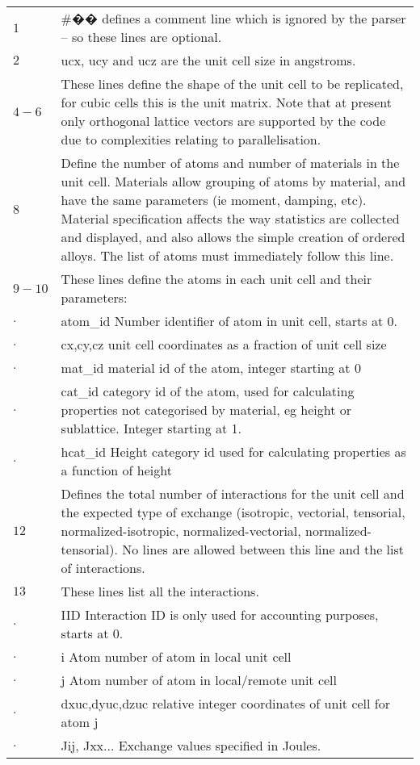 \begin{tabular}{ l p{8cm} }
$1$    & \#�� defines a comment line which is ignored by the parser – so these lines are optional.\\
$2$    & ucx, ucy and ucz are the unit cell size in angstroms.\\
$4-6$  & These lines define the shape of the unit cell to be replicated, for cubic cells this is the unit matrix. Note that at present only orthogonal lattice vectors are supported by the code due to complexities relating to parallelisation.\\
$8$    & Define the number of atoms and number of materials in the unit cell. Materials allow grouping of atoms by material, and have the same parameters (ie moment, damping, etc). Material specification affects the way statistics are collected and displayed, and also allows the simple creation of ordered alloys. The list of atoms must immediately follow this line.\\
$9-10$ & These lines define the atoms in each unit cell and their parameters:\\
$.$	 & atom\_id    Number identifier of atom in unit cell, starts at 0.\\
$.$	 & cx,cy,cz   unit cell coordinates as a fraction of unit cell size\\
$.$	 & mat\_id  material id of the atom, integer starting at 0\\
$.$	 & cat\_id  category id of the atom, used for calculating properties not categorised by material, eg height or sublattice. Integer starting at 1.\\
$.$	 & hcat\_id Height category id used for calculating properties as a function of height\\
$12$   & Defines the total number of interactions for the unit cell and the expected type of exchange
(isotropic, vectorial, tensorial, normalized-isotropic, normalized-vectorial, normalized-tensorial). No lines are allowed between this line and the list of interactions.\\
$13$   & These lines list all the interactions.\\
$.$	   & IID Interaction ID is only used for accounting purposes, starts at 0.\\
$.$	   & i Atom number of atom in local unit cell\\
$.$    & j Atom number of atom in local/remote unit cell\\
$.$    & dxuc,dyuc,dzuc relative integer coordinates of unit cell for atom j\\
$.$    & Jij, Jxx... Exchange values specified in Joules. \\
\end{tabular}

